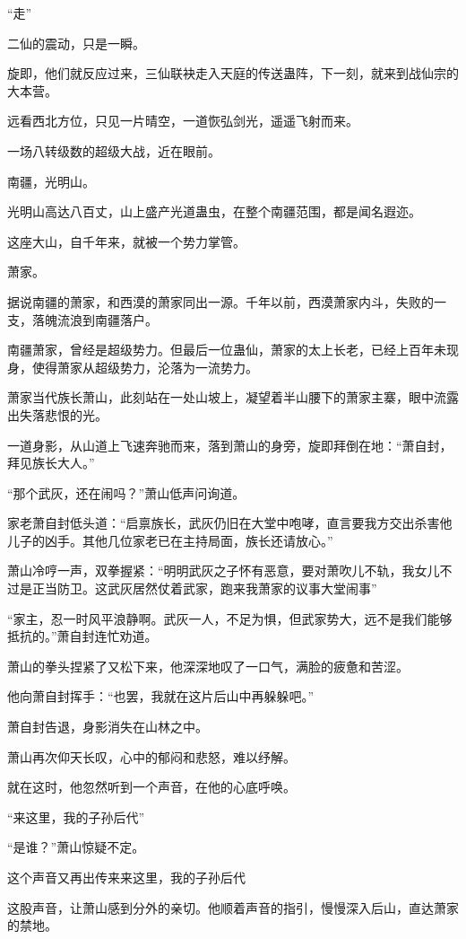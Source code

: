 \begin{this_body}
“走”

二仙的震动，只是一瞬。

旋即，他们就反应过来，三仙联袂走入天庭的传送蛊阵，下一刻，就来到战仙宗的大本营。

远看西北方位，只见一片晴空，一道恢弘剑光，遥遥飞射而来。

一场八转级数的超级大战，近在眼前。

南疆，光明山。

光明山高达八百丈，山上盛产光道蛊虫，在整个南疆范围，都是闻名遐迩。

这座大山，自千年来，就被一个势力掌管。

萧家。

据说南疆的萧家，和西漠的萧家同出一源。千年以前，西漠萧家内斗，失败的一支，落魄流浪到南疆落户。

南疆萧家，曾经是超级势力。但最后一位蛊仙，萧家的太上长老，已经上百年未现身，使得萧家从超级势力，沦落为一流势力。

萧家当代族长萧山，此刻站在一处山坡上，凝望着半山腰下的萧家主寨，眼中流露出失落悲恨的光。

一道身影，从山道上飞速奔驰而来，落到萧山的身旁，旋即拜倒在地：“萧自封，拜见族长大人。”

“那个武灰，还在闹吗？”萧山低声问询道。

家老萧自封低头道：“启禀族长，武灰仍旧在大堂中咆哮，直言要我方交出杀害他儿子的凶手。其他几位家老已在主持局面，族长还请放心。”

萧山冷哼一声，双拳握紧：“明明武灰之子怀有恶意，要对萧吹儿不轨，我女儿不过是正当防卫。这武灰居然仗着武家，跑来我萧家的议事大堂闹事”

“家主，忍一时风平浪静啊。武灰一人，不足为惧，但武家势大，远不是我们能够抵抗的。”萧自封连忙劝道。

萧山的拳头捏紧了又松下来，他深深地叹了一口气，满脸的疲惫和苦涩。

他向萧自封挥手：“也罢，我就在这片后山中再躲躲吧。”

萧自封告退，身影消失在山林之中。

萧山再次仰天长叹，心中的郁闷和悲怒，难以纾解。

就在这时，他忽然听到一个声音，在他的心底呼唤。

“来这里，我的子孙后代”

“是谁？”萧山惊疑不定。

这个声音又再出传来来这里，我的子孙后代

这股声音，让萧山感到分外的亲切。他顺着声音的指引，慢慢深入后山，直达萧家的禁地。


\end{this_body}
